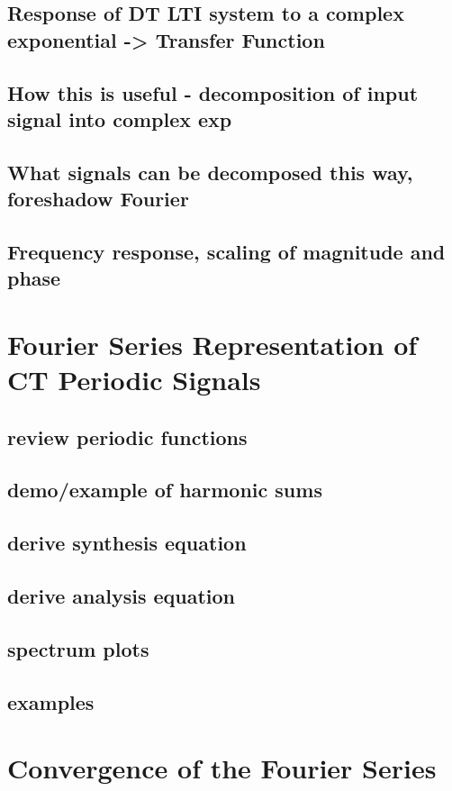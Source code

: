 \documentclass{article}
\begin{document}
\subsection{Response of DT LTI system to a complex exponential -> Transfer Function}
\label{sec:org7ba724a}
\subsection{How this is useful - decomposition of input signal into complex exp}
\label{sec:orge0520a1}
\subsection{What signals can be decomposed this way, foreshadow Fourier}
\label{sec:org097310e}
\subsection{Frequency response, scaling of magnitude and phase}
\label{sec:org9ebea42}
\section{Fourier Series Representation of CT Periodic Signals}
\label{sec:org651d66d}
\subsection{review periodic functions}
\label{sec:org5c98599}
\subsection{demo/example of harmonic sums}
\label{sec:orgdc9161b}
\subsection{derive synthesis equation}
\label{sec:org9d67cc2}
\subsection{derive analysis equation}
\label{sec:org186dd6d}
\subsection{spectrum plots}
\label{sec:orgea0d486}
\subsection{examples}
\label{sec:orgda563b3}
\section{Convergence of the Fourier Series}
\label{sec:org0a6d2d4}
\end{document}
